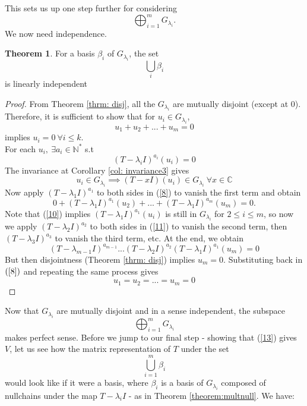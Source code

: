\documentclass{article}
\theoremstyle{definition}
\newtheorem{theorem}{Theorem}[subsection]
\newcommand{\C}{\mathbb{C}}
\newcommand{\id}{I}
\begin{document}
This sets us up one step further for considering $$\bigoplus_{i=1}^m G_{\lambda_i}.$$We now need independence.
\begin{theorem}
    For a basis $\beta_i$ of $G_{\lambda_i}$, the set $$\bigcup_i\beta_i$$is linearly independent
\end{theorem}
\begin{proof}
    From Theorem \ref{thrm: disj}, all the $G_{\lambda_i}$ are mutually disjoint (except at $0$). Therefore, it is sufficient to show that for $u_i\in G_{\lambda_i}$,
    \begin{equation}\label{8}
    u_1+u_2+...+u_m=0
    \end{equation}
    implies $u_i=0\ \forall i\leq k.$\\
    For each $u_i,\ \exists a_i\in \mathbb{N}^*$ s.t 
    \begin{equation}
        (T-\lambda_i\id)^{a_i}(u_i)=0
    \end{equation}
     The invariance at Corollary \ref{col: invariance3} gives 
     \begin{equation}\label {10} 
     u_i\in G_{\lambda_i}\implies (T-x\id)(u_i)\in G_{\lambda_i}\ \forall x\in \C
     \end{equation}
     Now apply $(T-\lambda_1\id)^{a_1}$ to both sides in (\ref{8}) to vanish the first term and obtain
     \begin{equation}\label{11}
     0+(T-\lambda_1\id)^{a_1}(u_2)+...+(T-\lambda_1\id)^{a_m}(u_m)=0.
     \end{equation}
     Note that (\ref{10}) implies $(T-\lambda_1\id)^{a_1}(u_i)$ is still in $G_{\lambda_i}$ for $2\leq i\leq m$, so now we apply $(T-\lambda_2\id)^{a_2}$ to both sides in (\ref{11}) to vanish the second term, then $(T-\lambda_3\id)^{a_3}$ to vanish the third term, etc. At the end, we obtain
     \begin{equation}
         (T-\lambda_{m-1}\id)^{a_{m-1}}...(T-\lambda_2\id)^{a_2}(T-\lambda_1\id)^{a_1}(u_m)=0
     \end{equation}
     But then disjointness (Theorem \ref{thrm: disj}) implies $u_m=0$. Substituting back in $(\ref{8})$ and repeating the same process gives $$u_1=u_2=...=u_m=0$$
\end{proof}

Now that $G_{\lambda_i}$ are mutually disjoint and in a sense independent, the subspace
\begin{equation}\label{13}
    \bigoplus_{i=1}^{m}G_{\lambda_i}
\end{equation}
makes perfect sense. Before we jump to our final step - showing that (\ref{13}) gives $V$, let us see how the matrix representation of $T$ under the set $$\bigcup_{i=1}^m \beta_i$$would look like if it were a basis, where $\beta_i$ is a basis of $G_{\lambda_i}$ composed of nullchains under the map $T-\lambda_iI$ - as in Theorem \ref{theorem:multnull}. We have:
\end{document}
